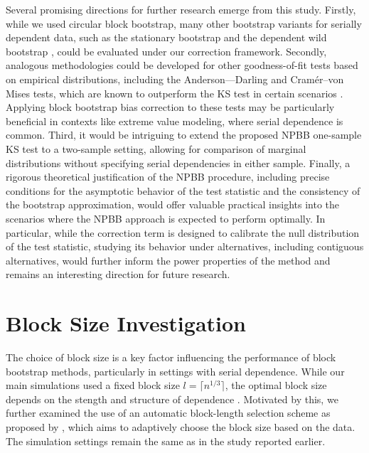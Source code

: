 \documentclass[12pt]{article}
\begin{document}
Several promising directions for further research emerge from
this study. Firstly, while we used circular block bootstrap, many
other bootstrap variants for serially dependent data, such as the
stationary bootstrap \citep{politis1994stationary} and the dependent wild
bootstrap \citep{shao2010dependent}, could be evaluated under our
correction framework. Secondly, analogous methodologies could be
developed for other goodness-of-fit tests based on empirical
distributions, including the Anderson---Darling and Cramér--von
Mises tests, which are known to outperform the KS test in certain scenarios
\citep{stephens2017tests}. Applying block bootstrap bias correction to
these tests may be particularly beneficial in contexts like extreme
value modeling, where serial dependence is common. Third, it would be
intriguing to extend the proposed NPBB
one-sample KS test to a two-sample setting, allowing for comparison of
marginal distributions without specifying serial dependencies in
either sample. Finally, a rigorous theoretical justification of the
NPBB procedure, including precise conditions for the asymptotic
behavior of the test statistic and the consistency of the bootstrap
approximation, would offer valuable practical insights into the
scenarios where the NPBB approach is expected to perform optimally.
In particular, while the
correction term is designed to calibrate the null distribution of the
test statistic, studying its behavior under alternatives, including
contiguous alternatives, would further inform the power properties of
the method and remains an interesting direction for future research.

\appendix

\section{Block Size Investigation}\label{sec:blocksize}

The choice of block size is a key factor influencing the performance
of block bootstrap methods, particularly in settings with serial
dependence. While our main simulations used a fixed block size
$l = \lceil n^{1/3} \rceil$, the optimal block size depends on the
stength and structure of dependence \citep{hall1995blocking,
  buhlmann1999block,  politis2004automatic}. Motivated by this, we
further examined the use of an automatic block-length selection scheme
as proposed by \citet{politis2004automatic}, which aims to adaptively
choose the block size based on the data. The simulation settings
remain the same as in the study reported earlier.
\end{document}
